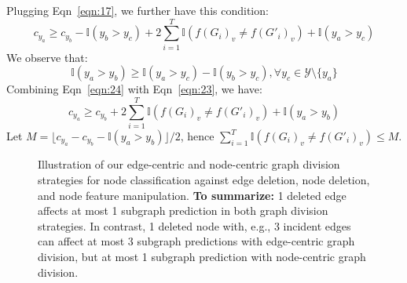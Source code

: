 Plugging Eqn~\ref{eqn:17}, we further have this condition:
\begin{equation}
\label{eqn:23}
c_{y_{a}} \geq c_{y_{b}}-\mathbb{I}(y_{b}>y_{c})+ 2\sum_{i=1}^{T}\mathbb{I}(f(G_{i})_v\neq f(G'_{i})_v)+\mathbb{I}(y_{a}>y_{c})
\end{equation}
We observe that:
\begin{equation}
\label{eqn:24}
\mathbb{I}(y_{a}>y_{b})\geq \mathbb{I}(y_{a}>y_{c})-\mathbb{I}(y_{b}>y_{c})
,\forall y_{c}\in \mathcal{Y}\setminus \{y_{a}\}\end{equation}
Combining Eqn~\ref{eqn:24} with Eqn~\ref{eqn:23}, we have:
\begin{equation}
c_{y_{a}} \geq c_{y_{b}}+2\sum_{i=1}^{T}\mathbb{I}(f(G_{i})_v\neq f(G'_{i})_v)+\mathbb{I}(y_{a}>y_{b})
\end{equation}
Let $M = {\lfloor c_{y_a}-c_{y_b}-\mathbb{I}(y_{a}>y_{b})\rfloor} / {2}$, hence 
$\sum\nolimits_{i=1}^{T}\mathbb{I}(f(G_{i})_v\neq f(G'_{i})_v) \leq M$.





\begin{figure*}[t]
    \centering
    \captionsetup[subfloat]{labelsep=none, format=plain, labelformat=empty}

    \hspace{+10mm}
   
    \hspace{+10mm}
    \caption{Illustration of our edge-centric and node-centric graph division strategies for node classification against edge deletion, node deletion, and node feature manipulation. 
    {\bf To summarize:} 1 deleted edge  affects at most 1 subgraph prediction in both graph division strategies. In contrast, 1 deleted node with, e.g., $3$ incident edges can affect at most 3 subgraph predictions with edge-centric graph division, but at most 1 subgraph prediction with node-centric graph division.
    }
    \label{fig:subgraphs_NC_more}
   \vspace{-2mm}
\end{figure*}


